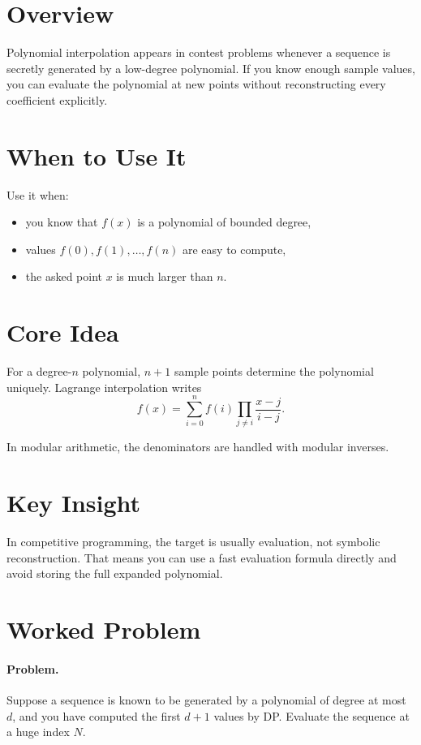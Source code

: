 \section*{Overview}

Polynomial interpolation appears in contest problems whenever a sequence is secretly generated by a low-degree
polynomial. If you know enough sample values, you can evaluate the polynomial at new points without reconstructing every
coefficient explicitly.

\section*{When to Use It}

Use it when:

\begin{itemize}
  \item you know that \(f(x)\) is a polynomial of bounded degree,
  \item values \(f(0), f(1), \dots, f(n)\) are easy to compute,
  \item the asked point \(x\) is much larger than \(n\).
\end{itemize}

\section*{Core Idea}

For a degree-\(n\) polynomial, \(n+1\) sample points determine the polynomial uniquely. Lagrange interpolation writes
\[
f(x) = \sum_{i=0}^{n} f(i)\prod_{j \ne i} \frac{x-j}{i-j}.
\]

In modular arithmetic, the denominators are handled with modular inverses.

\section*{Key Insight}

In competitive programming, the target is usually evaluation, not symbolic reconstruction. That means you can use a fast
evaluation formula directly and avoid storing the full expanded polynomial.

\section*{Worked Problem}

\paragraph{Problem.}
Suppose a sequence is known to be generated by a polynomial of degree at most \(d\), and you have computed the first
\(d+1\) values by DP. Evaluate the sequence at a huge index \(N\).

